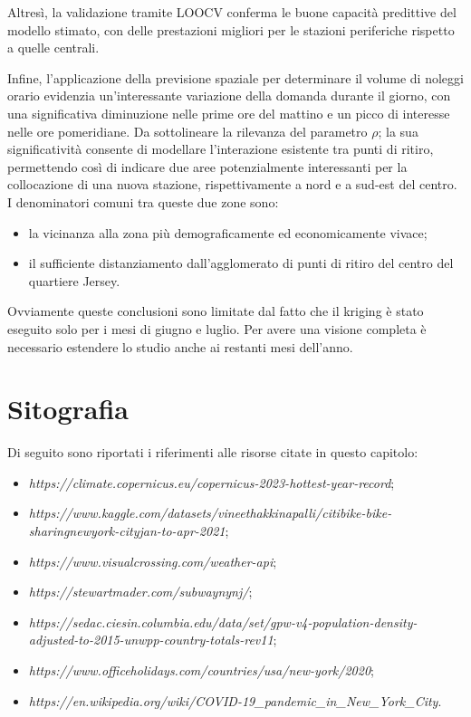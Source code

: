 \par Altresì, la validazione tramite LOOCV conferma le buone capacità predittive del modello stimato, con delle prestazioni migliori per le stazioni periferiche rispetto a quelle centrali. 
\par Infine, l'applicazione della previsione spaziale per determinare il volume di noleggi orario evidenzia un'interessante variazione della domanda durante il giorno, con una significativa diminuzione nelle prime ore del mattino e un picco di interesse nelle ore pomeridiane. Da sottolineare la rilevanza del parametro $\rho$; la sua significatività consente di modellare l'interazione esistente tra punti di ritiro, permettendo così di indicare due aree potenzialmente interessanti per la collocazione di una nuova stazione, rispettivamente a nord e a sud-est del centro. I denominatori comuni tra queste due zone sono:
\begin{itemize}
	\item la vicinanza alla zona più demograficamente ed economicamente vivace;
	\item il sufficiente distanziamento dall'agglomerato di punti di ritiro del centro del quartiere Jersey.
\end{itemize}
Ovviamente queste conclusioni sono limitate dal fatto che il kriging è stato eseguito solo per i mesi di giugno e luglio. Per avere una visione completa è necessario estendere lo studio anche ai restanti mesi dell'anno.

\section{Sitografia}
\label{sitografia_capitolo_4}
Di seguito sono riportati i riferimenti alle risorse citate in questo capitolo:
\begin{itemize}
	\item \textit{https://climate.copernicus.eu/copernicus-2023-hottest-year-record};
	\item \textit{https://www.kaggle.com/datasets/vineethakkinapalli/citibike-bike-sharingnewyork-cityjan-to-apr-2021};
	\item \textit{https://www.visualcrossing.com/weather-api};
	\item \textit{https://stewartmader.com/subwaynynj/};
	\item \textit{https://sedac.ciesin.columbia.edu/data/set/gpw-v4-population-density-adjusted-to-2015-unwpp-country-totals-rev11};
	\item \textit{https://www.officeholidays.com/countries/usa/new-york/2020};
	\item \textit{https://en.wikipedia.org/wiki/COVID-19\_pandemic\_in\_New\_York\_City}.
\end{itemize}
